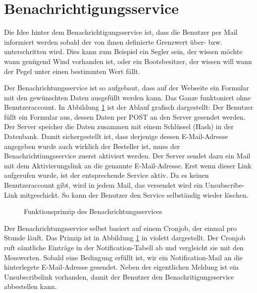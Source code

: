 \section{Benachrichtigungsservice}
Die Idee hinter dem Benachrichtigungsservice ist, dass die Benutzer per Mail informiert werden sobald der von ihnen definierte Grenzwert über- bzw. unterschritten wird. Dies kann zum Beispiel ein Segler sein, der wissen möchte wann genügend Wind vorhanden ist, oder ein Bootsbesitzer, der wissen will wann der Pegel unter einen bestimmten Wert fällt.

Der Benachrichtungsservice ist so aufgebaut, dass auf der Webseite ein Formular mit den gewünschten Daten ausgefüllt werden kann. Das Ganze funktoniert ohne Benutzeraccount. In Abbildung \ref{img:notificationKonzept} ist der Ablauf grafisch dargestellt: Der Benutzer füllt ein Formular aus, dessen Daten per POST an den Server gesendet werden. Der Server speicher die Daten zusammen mit einem Schlüssel (Hash) in der Datenbank. Damit sichergestellt ist, dass derjenige dessen E-Mail-Adresse angegeben wurde auch wirklich der Besteller ist, muss der Benachrichtiungsservice zuerst aktiviert werden. Der Server sendet dazu ein Mail mit dem Aktivierungslink an die genannte E-Mail-Adresse. Erst wenn dieser Link aufgerufen wurde, ist der entsprechende Service aktiv. Da es keinen Benutzeraccount gibt, wird in jedem Mail, das versendet wird ein Unsubscribe-Link mitgeschickt. So kann der Benutzer den Service selbständig wieder löschen.

\begin{figure}[h!]
	\centering
	\caption{Funktionsprinzip des Benachrichtungsservices}
	\label{img:notificationKonzept}
\end{figure}

Der Benachrichtungsservice selbst basiert auf einem Cronjob, der einmal pro Stunde läuft. Das Prinzip ist in Abbildung \ref{img:notificationKonzept} in violett dargestellt. Der Cronjob ruft sämtliche Einträge in der Notification-Tabell ab und vergleicht sie mit den Messwerten. Sobald eine Bedingung erfüllt ist, wir ein Notification-Mail an die hinterlegete E-Mail-Adresse gesendet. Neben der eigentlichen Meldung ist ein Unsubscribelink vorhanden, damit der Benutzer den Benachritigungsservice abbestellen kann.

